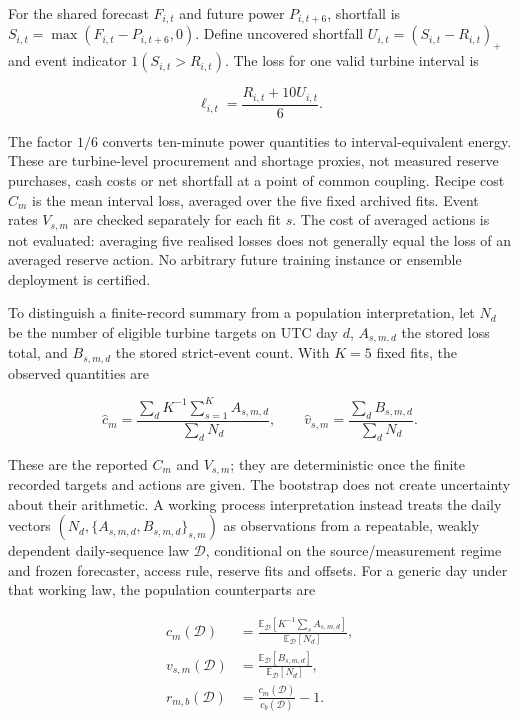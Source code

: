 \documentclass[
  british,
  11pt,
]{article}
\begin{document}
For the shared forecast \(F_{i,t}\) and future power \(P_{i,t+6}\),
shortfall is \(S_{i,t}=\max(F_{i,t}-P_{i,t+6},0)\). Define uncovered
shortfall \(U_{i,t}=(S_{i,t}-R_{i,t})_+\) and event indicator
\(1(S_{i,t}>R_{i,t})\). The loss for one valid turbine interval is

\[
\ell_{i,t}=\frac{R_{i,t}+10U_{i,t}}{6}.
\]

The factor \(1/6\) converts ten-minute power quantities to
interval-equivalent energy. These are turbine-level procurement and
shortage proxies, not measured reserve purchases, cash costs or net
shortfall at a point of common coupling. Recipe cost \(C_m\) is the mean
interval loss, averaged over the five fixed archived fits. Event rates
\(V_{s,m}\) are checked separately for each fit \(s\). The cost of
averaged actions is not evaluated: averaging five realised losses does
not generally equal the loss of an averaged reserve action. No arbitrary
future training instance or ensemble deployment is certified.

To distinguish a finite-record summary from a population interpretation,
let \(N_d\) be the number of eligible turbine targets on UTC day \(d\),
\(A_{s,m,d}\) the stored loss total, and \(B_{s,m,d}\) the stored
strict-event count. With \(K=5\) fixed fits, the observed quantities are

\[
\widehat c_m=\frac{\sum_d K^{-1}\sum_{s=1}^K A_{s,m,d}}{\sum_d N_d},
\qquad
\widehat v_{s,m}=\frac{\sum_d B_{s,m,d}}{\sum_d N_d}.
\]

These are the reported \(C_m\) and \(V_{s,m}\); they are deterministic
once the finite recorded targets and actions are given. The bootstrap
does not create uncertainty about their arithmetic. A working process
interpretation instead treats the daily vectors
\((N_d,\{A_{s,m,d},B_{s,m,d}\}_{s,m})\) as observations from a
repeatable, weakly dependent daily-sequence law \(\mathcal D\),
conditional on the source/measurement regime and frozen forecaster,
access rule, reserve fits and offsets. For a generic day under that
working law, the population counterparts are

\[
\begin{aligned}
c_m(\mathcal D)&=\frac{\mathbb E_{\mathcal D}[K^{-1}\sum_s A_{s,m,d}]}{\mathbb E_{\mathcal D}[N_d]},\\
v_{s,m}(\mathcal D)&=\frac{\mathbb E_{\mathcal D}[B_{s,m,d}]}{\mathbb E_{\mathcal D}[N_d]},\\
r_{m,b}(\mathcal D)&=\frac{c_m(\mathcal D)}{c_b(\mathcal D)}-1.
\end{aligned}
\]
\end{document}
